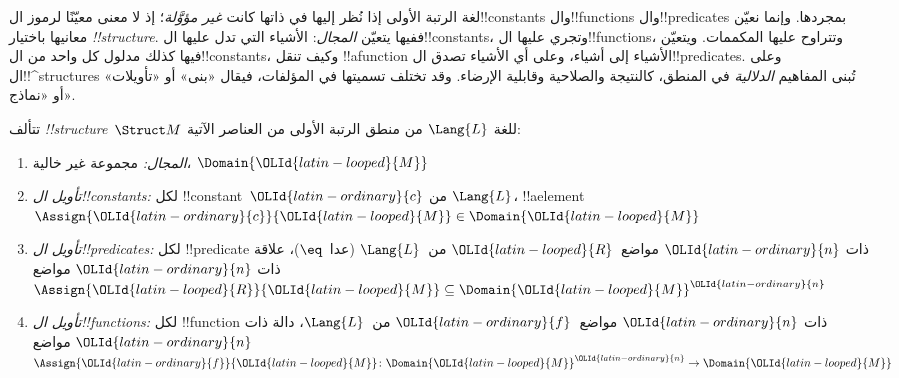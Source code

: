 \documentclass[../../../include/open-logic-section]{subfiles}
\begin{document}


\begin{explain}
لغة الرتبة الأولى إذا نُظر إليها في ذاتها كانت \emph{غير مؤوَّلة}؛
إذ لا معنى معيّنًا لرموز ال!!{constant}s وال!!{function}s
وال!!{predicate}s بمجردها. وإنما نعيّن معانيها باختيار
 \emph{!!{structure}}. ففيها يتعيّن
\emph{المجال}: الأشياء التي تدل عليها ال!!{constant}s، وتجري
عليها ال!!{function}s، وتتراوح عليها المكممات. ويتعيّن فيها كذلك
مدلول كل واحد من ال!!{constant}s، وكيف تنقل !!a{function} الأشياء
إلى أشياء، وعلى أي الأشياء تصدق ال!!{predicate}s.
وعلى ال!!^{structure}s تُبنى المفاهيم \emph{الدلالية} في المنطق،
كالنتيجة والصلاحية وقابلية الإرضاء. وقد تختلف تسميتها في
المؤلفات، فيقال «بنى» أو «تأويلات» أو «نماذج».
\end{explain}

\begin{defn}[!!^{structure}s]
تتألف  \emph{!!{structure}}~$\Struct M$ للغة
$\Lang{L}$ من منطق الرتبة الأولى من العناصر الآتية:
\begin{enumerate}
\item \emph{المجال:} مجموعة غير خالية، $\Domain {\OLId{latin-looped}{M}}$
\item \emph{تأويل ال!!{constant}s:} لكل !!{constant}~${\OLId{latin-ordinary}{c}}$ من
  $\Lang{L}$، !!a{element}~$\Assign{{\OLId{latin-ordinary}{c}}}{{\OLId{latin-looped}{M}}} \in \Domain {\OLId{latin-looped}{M}}$
\item \emph{تأويل ال!!{predicate}s:} لكل !!{predicate} ذات
  ${\OLId{latin-ordinary}{n}}$ مواضع~${\OLId{latin-looped}{R}}$ من~$\Lang{L}$ (عدا~$\eq$)، علاقة ذات ${\OLId{latin-ordinary}{n}}$ مواضع
  $\Assign{{\OLId{latin-looped}{R}}}{{\OLId{latin-looped}{M}}} \subseteq \Domain{{\OLId{latin-looped}{M}}}^{\OLId{latin-ordinary}{n}}$
\item \emph{تأويل ال!!{function}s:} لكل !!{function} ذات
  ${\OLId{latin-ordinary}{n}}$ مواضع~${\OLId{latin-ordinary}{f}}$ من~$\Lang{L}$، دالة ذات ${\OLId{latin-ordinary}{n}}$ مواضع
  $\Assign{{\OLId{latin-ordinary}{f}}}{{\OLId{latin-looped}{M}}} \colon \Domain{{\OLId{latin-looped}{M}}}^{\OLId{latin-ordinary}{n}} \to \Domain{{\OLId{latin-looped}{M}}}$
\end{enumerate}
\end{defn}
\end{document}
